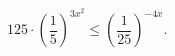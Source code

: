 \begin{ex}[type=inequality]
	\begin{condition}
		$ 125\cdot\left(\dfrac{1}{5}\right)^{3x^2}\leqslant\left(\dfrac{1}{25}\right)^{-4x} .$
	\end{condition}
\end{ex}